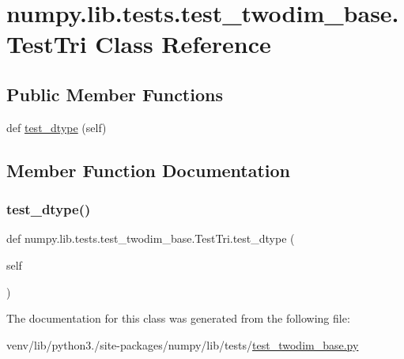 \hypertarget{classnumpy_1_1lib_1_1tests_1_1test__twodim__base_1_1TestTri}{}\section{numpy.\+lib.\+tests.\+test\+\_\+twodim\+\_\+base.\+Test\+Tri Class Reference}
\label{classnumpy_1_1lib_1_1tests_1_1test__twodim__base_1_1TestTri}
\subsection*{Public Member Functions}
\begin{DoxyCompactItemize}
\item 
def \hyperlink{classnumpy_1_1lib_1_1tests_1_1test__twodim__base_1_1TestTri_a29d26770bb7e1bc05dc4a8e65490788a}{test\+\_\+dtype} (self)
\end{DoxyCompactItemize}


\subsection{Member Function Documentation}
\mbox{\label{classnumpy_1_1lib_1_1tests_1_1test__twodim__base_1_1TestTri_a29d26770bb7e1bc05dc4a8e65490788a}} 
\subsubsection{\texorpdfstring{test\+\_\+dtype()}{test\_dtype()}}
{\footnotesize\ttfamily def numpy.\+lib.\+tests.\+test\+\_\+twodim\+\_\+base.\+Test\+Tri.\+test\+\_\+dtype (\begin{DoxyParamCaption}\item[{}]{self }\end{DoxyParamCaption})}



The documentation for this class was generated from the following file\+:\begin{DoxyCompactItemize}
\item 
venv/lib/python3./site-\/packages/numpy/lib/tests/\hyperlink{test__twodim__base_8py}{test\+\_\+twodim\+\_\+base.\+py}\end{DoxyCompactItemize}
